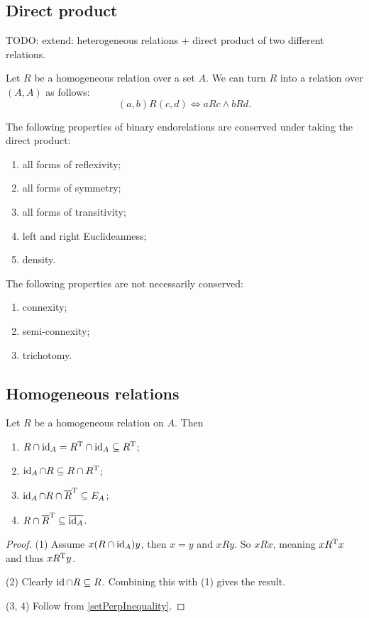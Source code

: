\subsection{Direct product}
TODO: extend: heterogeneous relations + direct product of two different relations.
\begin{definition}
Let $R$ be a homogeneous relation over a set $A$. We can turn $R$ into a relation over $(A, A)$ as follows:
\[ (a,b)R(c,d) \iff aRc \land bRd. \]
\end{definition}
\begin{lemma} \label{relationPropertiesDirectProduct}
The following properties of binary endorelations are conserved under taking the direct product:
\begin{enumerate}
\item all forms of reflexivity;
\item all forms of symmetry;
\item all forms of transitivity;
\item left and right Euclideanness;
\item density.
\end{enumerate}
The following properties are not necessarily conserved:
\begin{enumerate}
\item connexity;
\item semi-connexity;
\item trichotomy.
\end{enumerate}
\end{lemma}

\subsection{Homogeneous relations}
\begin{lemma} \label{selfRelatedElements}
Let $R$ be a homogeneous relation on $A$. Then
\begin{enumerate}
\item $R\cap \operatorname{id}_A = R^{\mathrm{T}}\cap \operatorname{id}_A \subseteq R^{\mathrm{T}}$;
\item $\operatorname{id}_A \cap R \subseteq R\cap R^{\mathrm{T}}$;
\item $\operatorname{id}_A \cap R\cap \overline{R}^{\mathrm{T}} \subseteq E_A$;
\item $R\cap \overline{R}^{\mathrm{T}} \subseteq \overline{\operatorname{id}_A}$.
\end{enumerate}
\end{lemma}
\begin{proof}
(1) Assume $x(R\cap \operatorname{id}_A)y$, then $x=y$ and $xRy$. So $xRx$, meaning $xR^{\mathrm{T}} x$ and thus $xR^{\mathrm{T}} y$.

(2) Clearly $\operatorname{id} \cap R \subseteq R$. Combining this with (1) gives the result.

(3, 4) Follow from \ref{setPerpInequality}.
\end{proof}


